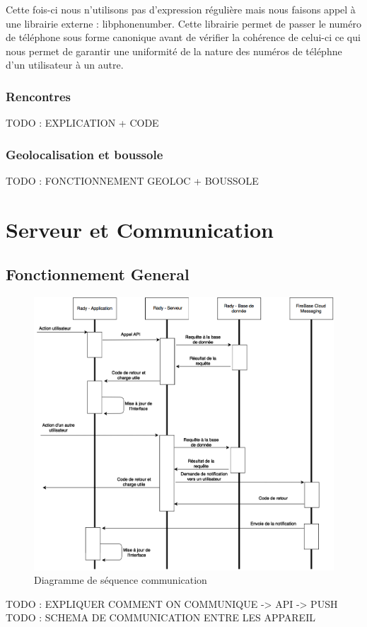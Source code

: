 \documentclass[french]{article}
\begin{document}
	Cette fois-ci nous n'utilisons pas d'expression régulière mais nous faisons appel à une librairie externe : libphonenumber.
	Cette librairie permet de passer le numéro de téléphone sous forme canonique avant de vérifier la cohérence de celui-ci ce qui nous permet de garantir une uniformité de la nature des numéros de téléphne d'un utilisateur à un autre.
	
	 
	
	\subsubsection{Rencontres}
	
	TODO : EXPLICATION + CODE
	
	\subsubsection{Geolocalisation et boussole}
	
	TODO : FONCTIONNEMENT GEOLOC + BOUSSOLE
	
	
	\section{Serveur et Communication}	
	\subsection{Fonctionnement General}
	
	\begin{figure}[H]
		\centering
		\includegraphics[scale=0.50]{../schema/schema-sequence-communication.png}
		\caption{Diagramme de séquence communication}
		\label{Diagramme de séquence communication}
	\end{figure}
	TODO : EXPLIQUER COMMENT ON COMMUNIQUE -> API -> PUSH
	TODO : SCHEMA DE COMMUNICATION ENTRE LES APPAREIL 
	
\end{document}
